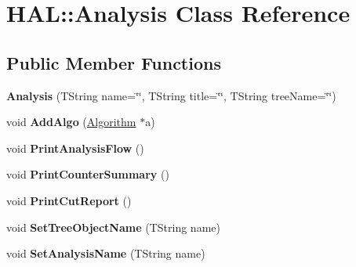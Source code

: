 \hypertarget{class_h_a_l_1_1_analysis}{\section{H\-A\-L\-:\-:Analysis Class Reference}
\label{class_h_a_l_1_1_analysis}
}
\subsection*{Public Member Functions}
\begin{DoxyCompactItemize}
\item 
\hypertarget{class_h_a_l_1_1_analysis_ab95bfff098f6a9543d444078cef3be91}{{\bfseries Analysis} (T\-String name=\char`\"{}\char`\"{}, T\-String title=\char`\"{}\char`\"{}, T\-String tree\-Name=\char`\"{}\char`\"{})}\label{class_h_a_l_1_1_analysis_ab95bfff098f6a9543d444078cef3be91}

\item 
\hypertarget{class_h_a_l_1_1_analysis_a8a4413dce12542ad4a4530f7a506d53b}{void {\bfseries Add\-Algo} (\hyperlink{class_h_a_l_1_1_algorithm}{Algorithm} $\ast$a)}\label{class_h_a_l_1_1_analysis_a8a4413dce12542ad4a4530f7a506d53b}

\item 
\hypertarget{class_h_a_l_1_1_analysis_af755ad7b542eb634144c99b1d142519c}{void {\bfseries Print\-Analysis\-Flow} ()}\label{class_h_a_l_1_1_analysis_af755ad7b542eb634144c99b1d142519c}

\item 
\hypertarget{class_h_a_l_1_1_analysis_ab43d960b19657610674983c5e893e78b}{void {\bfseries Print\-Counter\-Summary} ()}\label{class_h_a_l_1_1_analysis_ab43d960b19657610674983c5e893e78b}

\item 
\hypertarget{class_h_a_l_1_1_analysis_adb9295eeb04813bca9440f617452fec1}{void {\bfseries Print\-Cut\-Report} ()}\label{class_h_a_l_1_1_analysis_adb9295eeb04813bca9440f617452fec1}

\item 
\hypertarget{class_h_a_l_1_1_analysis_a56e97ef132e10b2a5f96c71c5145127b}{void {\bfseries Set\-Tree\-Object\-Name} (T\-String name)}\label{class_h_a_l_1_1_analysis_a56e97ef132e10b2a5f96c71c5145127b}

\item 
\hypertarget{class_h_a_l_1_1_analysis_abcbdb0f6cad2060cf3f6bca7d0eb9ada}{void {\bfseries Set\-Analysis\-Name} (T\-String name)}\label{class_h_a_l_1_1_analysis_abcbdb0f6cad2060cf3f6bca7d0eb9ada}


\end{DoxyCompactItemize}
